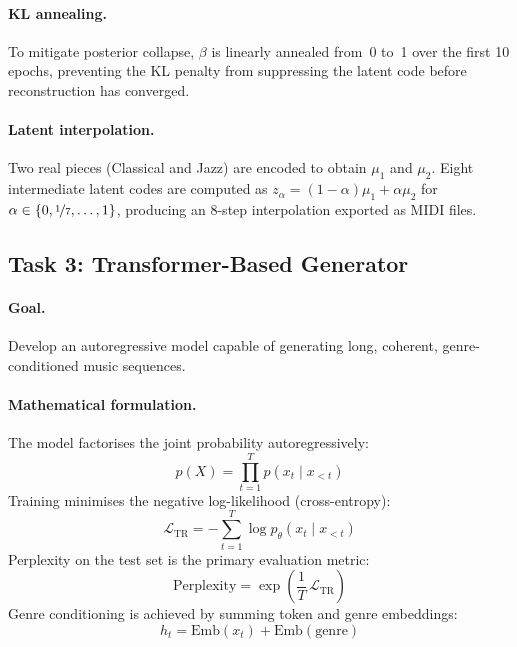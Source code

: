 \documentclass[letterpaper]{article}
\newcommand{\Lcal}{\mathcal{L}}
\begin{document}
\paragraph{KL annealing.}
To mitigate posterior collapse, $\beta$ is linearly annealed from~0 to~1
over the first 10 epochs, preventing the KL penalty from suppressing the
latent code before reconstruction has converged.

\paragraph{Latent interpolation.}
Two real pieces (Classical and Jazz) are encoded to obtain $\mu_1$ and
$\mu_2$.  Eight intermediate latent codes are computed as
$z_\alpha = (1-\alpha)\mu_1 + \alpha\mu_2$ for
$\alpha \in \{0, \nicefrac{1}{7}, \ldots, 1\}$, producing an 8-step
interpolation exported as MIDI files.

\subsection{Task 3: Transformer-Based Generator}
\label{sec:task3}

\paragraph{Goal.}
Develop an autoregressive model capable of generating long, coherent,
genre-conditioned music sequences.

\paragraph{Mathematical formulation.}
The model factorises the joint probability autoregressively:
\begin{equation}
  p(X) = \prod_{t=1}^{T} p\!\left(x_t \mid x_{<t}\right)
\end{equation}
Training minimises the negative log-likelihood (cross-entropy):
\begin{equation}
  \Lcal_{\mathrm{TR}} = -\sum_{t=1}^{T} \log p_\theta(x_t \mid x_{<t})
\end{equation}
Perplexity on the test set is the primary evaluation metric:
\begin{equation}
  \mathrm{Perplexity} = \exp\!\left(\frac{1}{T}\,\Lcal_{\mathrm{TR}}\right)
\end{equation}
Genre conditioning is achieved by summing token and genre embeddings:
\begin{equation}
  h_t = \mathrm{Emb}(x_t) + \mathrm{Emb}(\mathrm{genre})
\end{equation}
\end{document}
